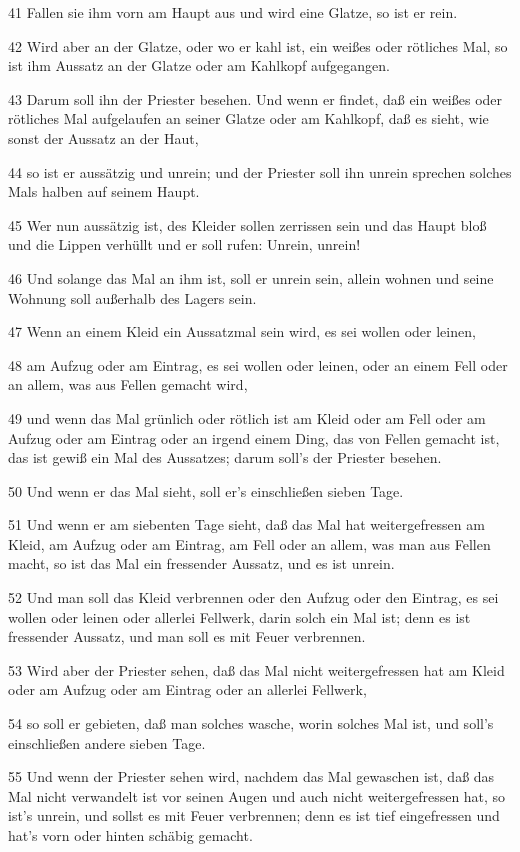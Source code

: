 \par 41 Fallen sie ihm vorn am Haupt aus und wird eine Glatze, so ist er rein.
\par 42 Wird aber an der Glatze, oder wo er kahl ist, ein weißes oder rötliches Mal, so ist ihm Aussatz an der Glatze oder am Kahlkopf aufgegangen.
\par 43 Darum soll ihn der Priester besehen. Und wenn er findet, daß ein weißes oder rötliches Mal aufgelaufen an seiner Glatze oder am Kahlkopf, daß es sieht, wie sonst der Aussatz an der Haut,
\par 44 so ist er aussätzig und unrein; und der Priester soll ihn unrein sprechen solches Mals halben auf seinem Haupt.
\par 45 Wer nun aussätzig ist, des Kleider sollen zerrissen sein und das Haupt bloß und die Lippen verhüllt und er soll rufen: Unrein, unrein!
\par 46 Und solange das Mal an ihm ist, soll er unrein sein, allein wohnen und seine Wohnung soll außerhalb des Lagers sein.
\par 47 Wenn an einem Kleid ein Aussatzmal sein wird, es sei wollen oder leinen,
\par 48 am Aufzug oder am Eintrag, es sei wollen oder leinen, oder an einem Fell oder an allem, was aus Fellen gemacht wird,
\par 49 und wenn das Mal grünlich oder rötlich ist am Kleid oder am Fell oder am Aufzug oder am Eintrag oder an irgend einem Ding, das von Fellen gemacht ist, das ist gewiß ein Mal des Aussatzes; darum soll's der Priester besehen.
\par 50 Und wenn er das Mal sieht, soll er's einschließen sieben Tage.
\par 51 Und wenn er am siebenten Tage sieht, daß das Mal hat weitergefressen am Kleid, am Aufzug oder am Eintrag, am Fell oder an allem, was man aus Fellen macht, so ist das Mal ein fressender Aussatz, und es ist unrein.
\par 52 Und man soll das Kleid verbrennen oder den Aufzug oder den Eintrag, es sei wollen oder leinen oder allerlei Fellwerk, darin solch ein Mal ist; denn es ist fressender Aussatz, und man soll es mit Feuer verbrennen.
\par 53 Wird aber der Priester sehen, daß das Mal nicht weitergefressen hat am Kleid oder am Aufzug oder am Eintrag oder an allerlei Fellwerk,
\par 54 so soll er gebieten, daß man solches wasche, worin solches Mal ist, und soll's einschließen andere sieben Tage.
\par 55 Und wenn der Priester sehen wird, nachdem das Mal gewaschen ist, daß das Mal nicht verwandelt ist vor seinen Augen und auch nicht weitergefressen hat, so ist's unrein, und sollst es mit Feuer verbrennen; denn es ist tief eingefressen und hat's vorn oder hinten schäbig gemacht.
